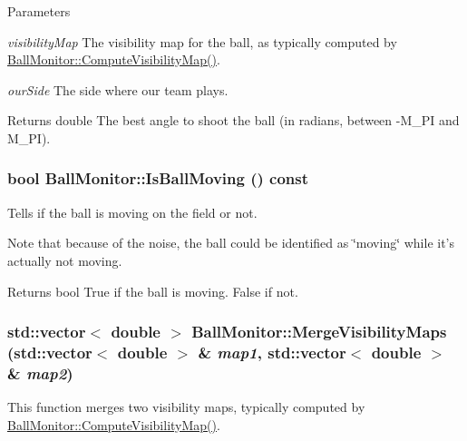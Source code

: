 \begin{DoxyParams}{Parameters}
\item[{\em visibilityMap}]The visibility map for the ball, as typically computed by \hyperlink{classBallMonitor_a0d2ef73ba2b0573021c800c311e08245}{BallMonitor::ComputeVisibilityMap()}. \item[{\em ourSide}]The side where our team plays. \end{DoxyParams}
\begin{DoxyReturn}{Returns}
double The best angle to shoot the ball (in radians, between -\/M\_\-PI and M\_\-PI). 
\end{DoxyReturn}
\hypertarget{classBallMonitor_a8995e71b82d80987984dd6b1ed89c0a0}{
\subsubsection[{IsBallMoving}]{\setlength{\rightskip}{0pt plus 5cm}bool BallMonitor::IsBallMoving () const}}
\label{classBallMonitor_a8995e71b82d80987984dd6b1ed89c0a0}


Tells if the ball is moving on the field or not. 

Note that because of the noise, the ball could be identified as \char`\"{}moving\char`\"{} while it's actually not moving. \begin{DoxyReturn}{Returns}
bool True if the ball is moving. False if not. 
\end{DoxyReturn}
\hypertarget{classBallMonitor_a74f8a1ce881528e475269fa1c964fa61}{
\subsubsection[{MergeVisibilityMaps}]{\setlength{\rightskip}{0pt plus 5cm}std::vector$<$ double $>$ BallMonitor::MergeVisibilityMaps (std::vector$<$ double $>$ \& {\em map1}, \/  std::vector$<$ double $>$ \& {\em map2})}}
\label{classBallMonitor_a74f8a1ce881528e475269fa1c964fa61}


This function merges two visibility maps, typically computed by \hyperlink{classBallMonitor_a0d2ef73ba2b0573021c800c311e08245}{BallMonitor::ComputeVisibilityMap()}. 


